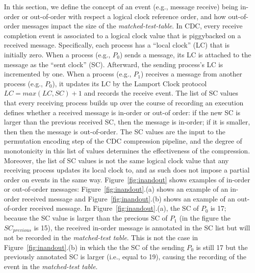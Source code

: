 In this section, we define the concept of an event (e.g., message
receive) being in-order or out-of-order with respect a logical clock
reference order, and how out-of-order messages impact the size of the
\textit{matched-test-table}. In CDC, every receive completion event is
associated to a logical clock value that is piggybacked on a received
message. Specifically, each process has a ``local clock'' (LC) that is
initially zero. When a process (e.g., $P_0$) sends a message, its LC
is attached to the message as the ``sent clock'' (SC). Afterward, the
sending process's LC is incremented by one. When a process (e.g.,
$P_1$) receives a message from another process (e.g., $P_0$), it
updates its LC by the Lamport Clock protocol $LC = max(LC, SC) + 1$
and records the receive event. The list of SC values that every
receiving process builds up over the course of recording an execution
defines whether a received message is in-order or out-of order: if the
new SC is larger than the previous received SC, then the message is
in-order; if it is smaller, then then the message is
out-of-order. The SC values are the input to the permutation
encoding step of the CDC compression pipeline, and the degree of
monotonicity in this list of values determines the effectiveness of
the compression. Moreover, the list of SC values is not the same
logical clock value that any receiving process updates its local clock
to, and as such does not impose a partial order on events in the same
way. Figure~\ref{fig:inandout} shows examples of in-order or
out-of-order messages: Figure~\ref{fig:inandout}.(a) shows an example
of an in-order received message and Figure~\ref{fig:inandout}.(b) shows
an example of an out-of-order received message. In
Figure~\ref{fig:inandout}.(a), the SC of $P_0$ is 17; because the SC
value is larger than the precious SC of $P_1$ (in the figure the
$SC_{previous}$ is 15), the received in-order message is annotated in
the SC list but will not be recorded in the \textit{matched-test
  table}. This is not the case in Figure~\ref{fig:inandout}.(b) in
which the the SC of the sending $P_0$ is still 17 but the previously
annotated SC is larger (i.e., equal to 19), causing the recording of
the event in the \textit{matched-test table}.
